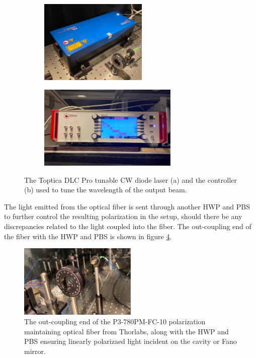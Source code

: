 \begin{figure}[h!]
    \begin{subfigure}[b]{0.49\textwidth}
        \centering
        \includegraphics[height=4cm]{figures/toptica_laser.pdf}
        \caption{}
        \label{fig:toptica_laser}
    \end{subfigure}
    \begin{subfigure}[b]{0.49\textwidth}
        \centering
        \includegraphics[height=4cm]{figures/toptica_controller.pdf}
        \caption{}
        \label{fig:toptica_controller}
    \end{subfigure}
    \caption{The Toptica DLC Pro tunable CW diode laser (a) and the controller (b) used to tune the wavelength of the output beam.}
    \label{fig:toptica_laser_and_controller}
\end{figure}

The light emitted from the optical fiber is sent through another HWP and PBS to further control the resulting polarization in the setup, should there be any discrepancies related to the light coupled into the fiber. The out-coupling end of the fiber with the HWP and PBS is shown in figure \ref{fig:outcoupling_fiber}.

\begin{figure}[h!]
    \centering
    \includegraphics[width=0.5\textwidth]{figures/outcoupling_fiber.pdf}
    \caption{The out-coupling end of the P3-780PM-FC-10 polarization maintaining optical fiber from Thorlabs, along with the HWP and PBS ensuring linearly polarizaed light incident on the cavity or Fano mirror.}
    \label{fig:outcoupling_fiber}
\end{figure}

